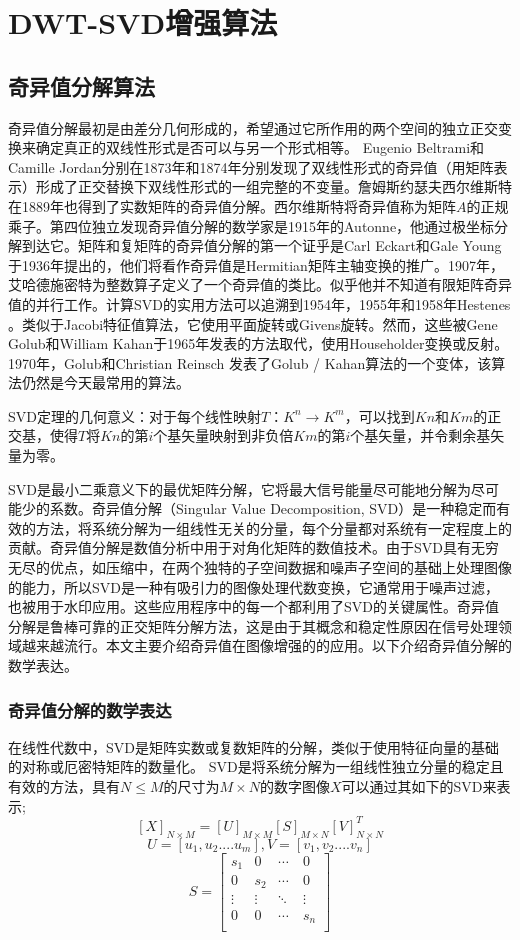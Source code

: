 \chapter{DWT-SVD增强算法}\label{chap:DWT-SVD}

		\section{奇异值分解算法}奇异值分解最初是由差分几何形成的，希望通过它所作用的两个空间的独立正交变换来确定真正的双线性形式是否可以与另一个形式相等。 Eugenio Beltrami和Camille Jordan分别在1873年和1874年分别发现了双线性形式的奇异值（用矩阵表示）形成了正交替换下双线性形式的一组完整的不变量。詹姆斯约瑟夫西尔维斯特在1889年也得到了实数矩阵的奇异值分解。西尔维斯特将奇异值称为矩阵$A$的正规乘子。第四位独立发现奇异值分解的数学家是1915年的Autonne，他通过极坐标分解到达它。矩阵和复矩阵的奇异值分解的第一个证乎是Carl Eckart和Gale Young于1936年提出的，他们将看作奇异值是Hermitian矩阵主轴变换的推广。1907年，艾哈德施密特为整数算子定义了一个奇异值的类比。似乎他并不知道有限矩阵奇异值的并行工作。计算SVD的实用方法可以追溯到1954年，1955年和1958年Hestenes 。类似于Jacobi特征值算法，它使用平面旋转或Givens旋转。然而，这些被Gene Golub和William Kahan于1965年发表的方法取代，使用Householder变换或反射。 1970年，Golub和Christian Reinsch 发表了Golub / Kahan算法的一个变体，该算法仍然是今天最常用的算法。

SVD定理的几何意义：对于每个线性映射$T：K^n→K^m$，可以找到$Kn$和$Km$的正交基，使得$T$将$Kn$的第$i$个基矢量映射到非负倍$Km$的第$i$个基矢量，并令剩余基矢量为零。

SVD是最小二乘意义下的最优矩阵分解，它将最大信号能量尽可能地分解为尽可能少的系数。奇异值分解（Singular Value Decomposition, SVD）是一种稳定而有效的方法，将系统分解为一组线性无关的分量，每个分量都对系统有一定程度上的贡献。奇异值分解是数值分析中用于对角化矩阵的数值技术。由于SVD具有无穷无尽的优点，如压缩中，在两个独特的子空间数据和噪声子空间的基础上处理图像的能力，所以SVD是一种有吸引力的图像处理代数变换，它通常用于噪声过滤，也被用于水印应用。这些应用程序中的每一个都利用了SVD的关键属性。奇异值分解是鲁棒可靠的正交矩阵分解方法，这是由于其概念和稳定性原因在信号处理领域越来越流行。本文主要介绍奇异值在图像增强的的应用。以下介绍奇异值分解的数学表达。
			\subsection{奇异值分解的数学表达}在线性代数中，SVD是矩阵实数或复数矩阵的分解，类似于使用特征向量的基础的对称或厄密特矩阵的数量化。 SVD是将系统分解为一组线性独立分量的稳定且有效的方法，具有$N \leq M$的尺寸为$M×N$的数字图像$X$可以通过其如下的SVD来表示;
\begin{equation}	\left[ X \right] _{N×M}=\left[ U \right] _{M×M} \left[ S \right] _{M×N} \left[ V \right] ^T_{N×N}	\end{equation}			
\[ U=[u_1,u_2....u_m],	V=[v_1,v_2....v_n] \]
\[
S
=\begin{bmatrix}
s_1  &  0  & \cdots\ &0\\
0  &  s_2  & \cdots\ & 0\\
 \vdots   & \vdots & \ddots  & \vdots  \\
 0 & 0  & \cdots\ & s_n\\
\end{bmatrix}
\]

